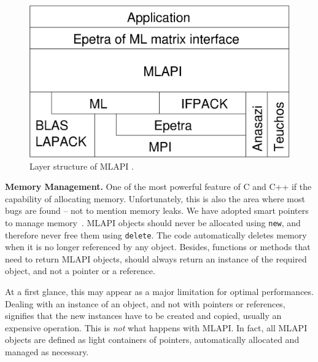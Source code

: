 \documentclass{article}[11pt]
\newcommand{\teuchos}  {{\sc Teuchos}}
\newcommand{\MLAPI}  {{\sc MLAPI }}
\newcommand{\MLAPIns}  {{\sc MLAPI}}
\begin{document}
\begin{figure}
\begin{center}
\includegraphics[width=12cm]{layer.eps}
\caption{Layer structure of \MLAPI.}
\label{fig:layer}
\end{center}
\end{figure}

\bigskip

\noindent
{\bf Memory Management.} One of the most powerful feature of C and C++
if the capability of allocating memory. Unfortunately, this is also the
area where most bugs are found -- not to mention memory leaks. We have adopted
smart pointers to manage memory~\cite{barlett04teuchos}.
\MLAPI objects should never be allocated using {\tt new}, and therefore never
free them using {\tt delete}. The code automatically deletes memory
when it is no longer referenced by any object. Besides, functions or methods
that need to return \MLAPI objects, should always return an instance of the
required object, and not a pointer or a reference.

\noindent
At a first glance, this may appear as a major limitation for optimal
performances. Dealing with an instance of an object, and not with pointers or
references, signifies that the new instances have to be created and copied,
usually an expensive operation. This is {\sl not} what happens with \MLAPIns. In
fact, all \MLAPI objects are defined as light containers of pointers,
  automatically allocated and managed as necessary. 
\end{document}
